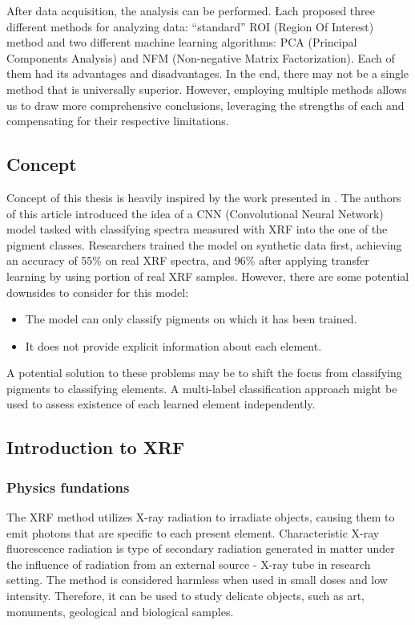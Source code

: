 After data acquisition, the analysis can be performed. 
Łach proposed three different methods for analyzing data: ``standard'' ROI (Region Of Interest) method and two different machine learning algorithms: PCA (Principal Components Analysis) and NFM (Non-negative Matrix Factorization). 
Each of them had its advantages and disadvantages. 
In the end, there may not be a single method that is universally superior. 
However, employing multiple methods allows us to draw more comprehensive conclusions, leveraging the strengths of each and compensating for their respective limitations.

\subsection{Concept}
Concept of this thesis is heavily inspired by the work presented in \cite{Jones2022}. 
The authors of this article introduced the idea of a CNN (Convolutional Neural Network) model tasked with classifying spectra measured with XRF into the one of the pigment classes. 
Researchers trained the model on synthetic data first, achieving an accuracy of 55\% on real XRF spectra, and 96\% after applying transfer learning by using portion of real XRF samples.  
However, there are some potential downsides to consider for this model:
\begin{itemize}
    \item The model can only classify pigments on which it has been trained.
    \item It does not provide explicit information about each element. 
\end{itemize}
A potential solution to these problems may be to shift the focus from classifying pigments to classifying elements. A multi-label classification approach might be used to assess existence of each learned element independently. 

\subsection{Introduction to XRF}
\subsubsection{Physics fundations}
The XRF method utilizes X-ray radiation to irradiate objects, causing them to emit photons that are specific to each present element.
Characteristic X-ray fluorescence radiation is type of secondary radiation generated in matter under the influence of radiation from an external source - X-ray tube in research setting.
The method is considered harmless when used in small doses and low intensity.  
Therefore, it can be used to study delicate objects, such as art, monuments, geological and biological samples.


